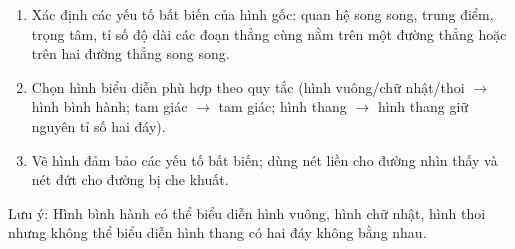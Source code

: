 \begin{enumerate}
\item Xác định các yếu tố bất biến của hình gốc: quan hệ song song, trung điểm, trọng tâm, tỉ số độ dài các đoạn thẳng cùng nằm trên một đường thẳng hoặc trên hai đường thẳng song song.
\item Chọn hình biểu diễn phù hợp theo quy tắc (hình vuông/chữ nhật/thoi $\to$ hình bình hành; tam giác $\to$ tam giác; hình thang $\to$ hình thang giữ nguyên tỉ số hai đáy).
\item Vẽ hình đảm bảo các yếu tố bất biến; dùng nét liền cho đường nhìn thấy và nét đứt cho đường bị che khuất.
\end{enumerate}
Lưu ý: Hình bình hành có thể biểu diễn hình vuông, hình chữ nhật, hình thoi nhưng không thể biểu diễn hình thang có hai đáy không bằng nhau.
